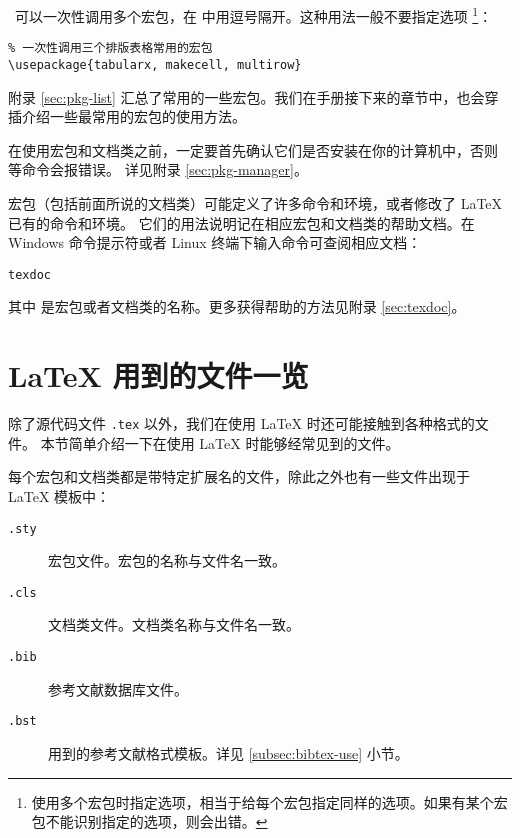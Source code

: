 ~可以一次性调用多个宏包，在  中用逗号隔开。这种用法一般不要指定选项%
\footnote{使用多个宏包时指定选项，相当于给每个宏包指定同样的选项。如果有某个宏包不能识别指定的选项，则会出错。}：
\begin{verbatim}
% 一次性调用三个排版表格常用的宏包
\usepackage{tabularx, makecell, multirow}
\end{verbatim}

附录 \ref{sec:pkg-list} 汇总了常用的一些宏包。我们在手册接下来的章节中，也会穿插介绍一些最常用的宏包的使用方法。

在使用宏包和文档类之前，一定要首先确认它们是否安装在你的计算机中，否则  等命令会报错误。
详见附录 \ref{sec:pkg-manager}。

宏包（包括前面所说的文档类）可能定义了许多命令和环境，或者修改了 \LaTeX{} 已有的命令和环境。
它们的用法说明记在相应宏包和文档类的帮助文档。在 Windows 命令提示符或者 Linux 终端下输入命令可查阅相应文档：
\begin{command}
\texttt{texdoc} 
\end{command}

其中  是宏包或者文档类的名称。更多获得帮助的方法见附录 \ref{sec:texdoc}。

\section{\LaTeX{} 用到的文件一览}\label{sec:latex-files}

除了源代码文件 \texttt{.tex} 以外，我们在使用 \LaTeX{} 时还可能接触到各种格式的文件。
本节简单介绍一下在使用 \LaTeX{} 时能够经常见到的文件。

每个宏包和文档类都是带特定扩展名的文件，除此之外也有一些文件出现于 \LaTeX{} 模板中：
\begin{description}
  \item[\texttt{.sty}] 宏包文件。宏包的名称与文件名一致。
  \item[\texttt{.cls}] 文档类文件。文档类名称与文件名一致。
  \item[\texttt{.bib}]  参考文献数据库文件。
  \item[\texttt{.bst}]  用到的参考文献格式模板。详见 \ref{subsec:bibtex-use} 小节。
\end{description}

